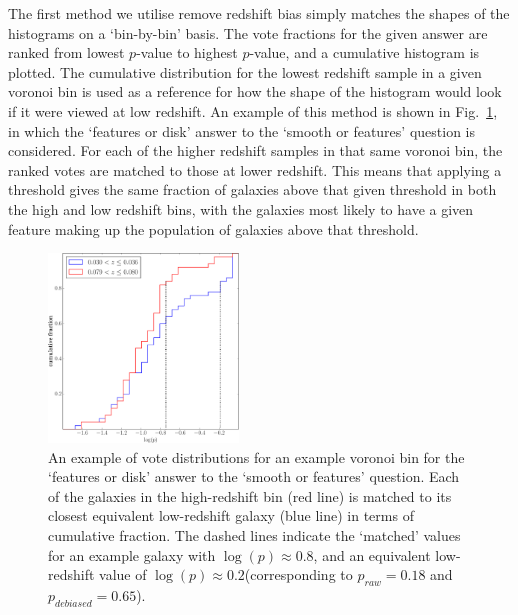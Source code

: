 \documentclass[useAMS,usenatbib]{mn2e}
\begin{document}
The first method we utilise remove redshift bias simply matches the shapes of the histograms on a `bin-by-bin' basis. The vote fractions for the given answer are ranked from lowest $p$-value to highest $p$-value, and a cumulative histogram is plotted. The cumulative distribution for the lowest redshift sample in a given voronoi bin is used as a reference for how the shape of the histogram would look if it were viewed at low redshift. An example of this method is shown in Fig.~\ref{fig:histogram_matching}, in which the `features or disk' answer to the `smooth or features' question is considered. For each of the higher redshift samples in that same voronoi bin, the ranked votes are matched to those at lower redshift. This means that applying a threshold gives the same fraction of galaxies above that given threshold in both the high and low redshift bins, with the galaxies most likely to have a given feature making up the population of galaxies above that threshold. 

\begin{figure}
		\centering

        \includegraphics[width=0.45\textwidth]{Images/Bias/Debiasing/histogram_matching.pdf}

        \caption{An example of vote distributions for an example voronoi bin for the `features or disk' answer to the `smooth or features' question. Each of the galaxies in the high-redshift bin (red line) is matched to its closest equivalent low-redshift galaxy (blue line) in terms of cumulative fraction. The dashed lines indicate the `matched' values for an example galaxy with $\log(p) \approx 0.8$, and an equivalent low-redshift value of $\log(p) \approx 0.2$(corresponding to $p_{raw}=0.18$ and $p_{debiased}=0.65$).}

        \label{fig:histogram_matching}

\end{figure}
\end{document}
